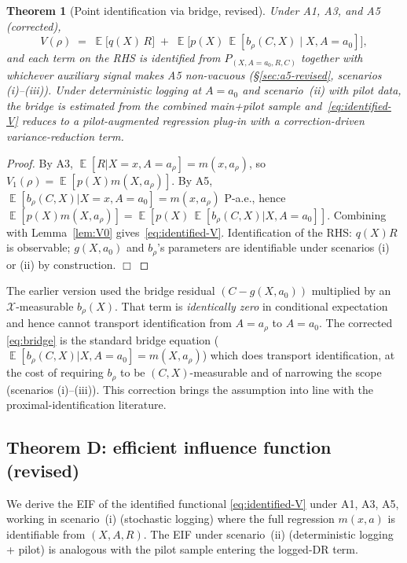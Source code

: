 \documentclass[11pt]{article}
\newtheorem{theorem}{Theorem}
\DeclareMathOperator{\E}{\mathbb{E}}
\begin{document}
\begin{theorem}[Point identification via bridge, revised]\label{thm:point-id}
Under A1, A3, and A5 (corrected),
\begin{equation}
V(\rho) \;=\; \E\bigl[q(X)\, R\bigr] \;+\; \E\bigl[p(X)\,\E[b_\rho(C, X) \mid X, A = a_0]\bigr],
\label{eq:identified-V}
\end{equation}
and each term on the RHS is identified from $P_{(X, A=a_0, R, C)}$
together with whichever auxiliary signal makes A5 non-vacuous
(§\ref{sec:a5-revised}, scenarios (i)--(iii)).  Under deterministic
logging at $A = a_0$ and scenario~(ii) with pilot data, the bridge
is estimated from the combined main+pilot sample and~\eqref{eq:identified-V}
reduces to a pilot-augmented regression plug-in with a
correction-driven variance-reduction term.
\end{theorem}
\begin{proof}
By A3, $\E[R | X = x, A = a_\rho] = m(x, a_\rho)$, so
$V_1(\rho) = \E[p(X) m(X, a_\rho)]$.
By A5, $\E[b_\rho(C, X) | X = x, A = a_0] = m(x, a_\rho)$ P-a.e., hence
$\E[p(X) m(X, a_\rho)] = \E[p(X)\,\E[b_\rho(C, X) | X, A = a_0]]$.
Combining with Lemma~\ref{lem:V0} gives~\eqref{eq:identified-V}.
Identification of the RHS: $q(X) R$ is observable; $g(X, a_0)$ and
$b_\rho$'s parameters are identifiable under scenarios (i) or (ii)
by construction. $\Box$
\end{proof}

\begin{remark}
The earlier version used the bridge residual $(C - g(X, a_0))$
multiplied by an $\mathcal{X}$-measurable $b_\rho(X)$.  That term
is \emph{identically zero} in conditional expectation and hence
cannot transport identification from $A = a_\rho$ to $A = a_0$.
The corrected \eqref{eq:bridge} is the standard bridge equation
($\E[b_\rho(C, X) | X, A = a_0] = m(X, a_\rho)$) which does
transport identification, at the cost of requiring $b_\rho$ to be
$(C, X)$-measurable and of narrowing the scope (scenarios
(i)--(iii)).  This correction brings the assumption into line with
the proximal-identification literature.
\end{remark}

\subsection{Theorem D: efficient influence function (revised)}

We derive the EIF of the identified functional \eqref{eq:identified-V}
under A1, A3, A5, working in scenario~(i) (stochastic logging) where
the full regression $m(x, a)$ is identifiable from $(X, A, R)$.  The
EIF under scenario~(ii) (deterministic logging + pilot) is analogous
with the pilot sample entering the logged-DR term.
\end{document}
